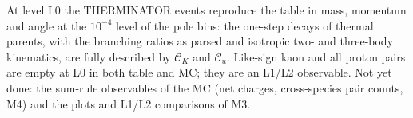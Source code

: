 \documentclass[11pt,a4paper]{article}
\newcommand{\CK}{\mathcal C_K}
\newcommand{\Cu}{\mathcal C_u}
\begin{document}
\noindent At level L0 the THERMINATOR events reproduce the table in mass, momentum and angle at the
$10^{-4}$ level of the pole bins: the one-step decays of thermal parents, with the branching ratios
as parsed and isotropic two- and three-body kinematics, are fully described by $\CK$ and $\Cu$.
Like-sign kaon and all proton pairs are empty at L0 in both table and MC; they are an L1/L2
observable. Not yet done: the sum-rule observables of the MC (net charges, cross-species pair
counts, M4) and the plots and L1/L2 comparisons of M3.
\end{document}
